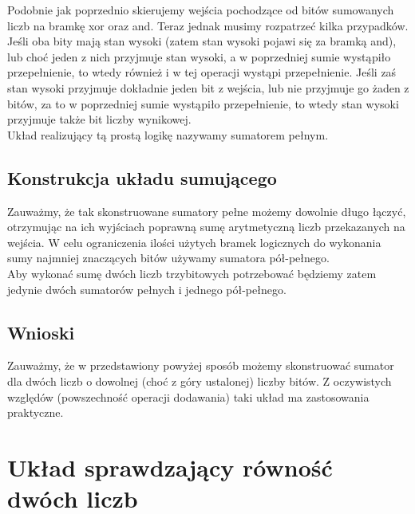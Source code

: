 \documentclass{article}
\begin{document}
            Podobnie jak poprzednio skierujemy wejścia pochodzące od bitów sumowanych liczb na bramkę xor oraz and. Teraz jednak musimy rozpatrzeć kilka przypadków. Jeśli oba bity mają stan wysoki (zatem stan wysoki pojawi się za bramką and), lub choć jeden z nich przyjmuje stan wysoki, a w poprzedniej sumie wystąpiło przepełnienie, to wtedy również i w tej operacji wystąpi przepełnienie. Jeśli zaś stan wysoki przyjmuje dokładnie jeden bit z wejścia, lub nie przyjmuje go żaden z bitów, za to w poprzedniej sumie wystąpiło przepełnienie, to wtedy stan wysoki przyjmuje także bit liczby wynikowej.\\
            Układ realizujący tą prostą logikę nazywamy sumatorem pełnym.
            \FloatBarrier
        
        \subsection{Konstrukcja układu sumującego}
            Zauważmy, że tak skonstruowane sumatory pełne możemy dowolnie długo łączyć, otrzymując na ich wyjściach poprawną sumę arytmetyczną liczb przekazanych na wejścia. W celu ograniczenia ilości użytych bramek logicznych do wykonania sumy najmniej znaczących bitów używamy sumatora pół-pełnego.\\ 
            Aby wykonać sumę dwóch liczb trzybitowych potrzebować będziemy zatem jedynie dwóch sumatorów pełnych i jednego pół-pełnego.
            
        \subsection{Wnioski}
            Zauważmy, że w przedstawiony powyżej sposób możemy skonstruować sumator dla dwóch liczb o dowolnej (choć z góry ustalonej) liczby bitów. Z oczywistych względów (powszechność operacji dodawania) taki układ ma zastosowania praktyczne. 
            
            
    \section{Układ sprawdzający równość dwóch liczb}
\end{document}
